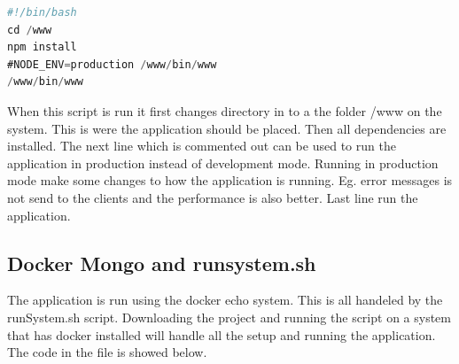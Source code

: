 \documentclass[a4paper,12pt,english]{article}
\begin{document}
\begin{lstlisting}[language=javascript]
#!/bin/bash
cd /www
npm install
#NODE_ENV=production /www/bin/www
/www/bin/www
\end{lstlisting}

When this script is run it first changes directory in to a the folder /www on the system. This is were the application should be placed. Then all dependencies are installed. The next line which is commented out can be used to run the application in production instead of development mode. Running in production mode make some changes to how the application is running. Eg. error messages is not send to the clients and the performance is also better.
Last line run the application.
\clearpage
\subsection{Docker Mongo and runsystem.sh}
The application is run using the docker echo system. This is all handeled by the runSystem.sh script. Downloading the project and running the script on a system that has docker installed will handle all the setup and running the application. The code in the file is showed below.
\end{document}
